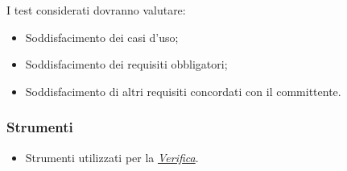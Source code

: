 I test considerati dovranno valutare:
\begin{itemize}
    \item 
        Soddisfacimento dei casi d’uso;
    \item 
        Soddisfacimento dei requisiti obbligatori;
    \item 
        Soddisfacimento di altri requisiti concordati con il committente.
\end{itemize}

\subsubsection{Strumenti}
\begin{itemize}
    \item 
        Strumenti utilizzati per la \hyperlink{subsubsec:strumentiVerifica}{\textit{Verifica}}.
\end{itemize}
